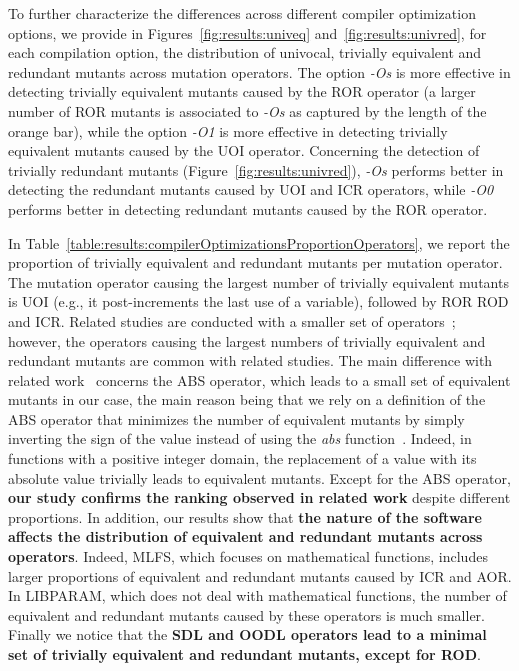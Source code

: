 To further characterize  the differences across different compiler optimization options, we provide in Figures~\ref{fig:results:univeq} and~\ref{fig:results:univred}, for each compilation option, the distribution of univocal, trivially equivalent and redundant mutants across mutation operators. The option \emph{-Os} is more effective in detecting trivially equivalent mutants caused by the ROR operator (a larger number of ROR mutants is associated to \emph{-Os} as captured by the length of the orange bar), while the option \emph{-O1} is more effective in detecting trivially equivalent mutants caused by the UOI operator. Concerning the detection of trivially redundant mutants (Figure~\ref{fig:results:univred}), \emph{-Os} performs better in detecting the redundant mutants caused by UOI and ICR operators, while \emph{-O0} performs better in detecting redundant mutants caused by the ROR operator.

In Table~\ref{table:results:compilerOptimizationsProportionOperators}, we report the proportion of trivially equivalent and  redundant mutants per mutation operator. The mutation operator causing the largest number of trivially equivalent mutants is UOI (e.g., it post-increments the last use of a variable), followed by ROR 
ROD 
and ICR. 
Related studies are conducted with a smaller set of operators~\cite{kintis2017detecting}; however, the operators causing the largest numbers of trivially equivalent and redundant mutants are common with related studies. The main difference with related work~\cite{kintis2017detecting} concerns the ABS operator, which leads to a small set of equivalent mutants in our case, the main reason being that we rely on a definition of the ABS operator that minimizes the number of equivalent mutants by simply inverting the sign of the value instead of using the \emph{abs} function~\cite{kintis2018effective}. Indeed, in functions with a positive integer domain, the replacement of a value with its absolute value trivially leads to equivalent mutants. Except for the ABS operator, \textbf{our study confirms the ranking observed in related work} despite different proportions. In addition, our results show that \textbf{the nature of the software affects the distribution of equivalent and redundant mutants across operators}. Indeed, MLFS, which focuses on mathematical functions, includes larger proportions of equivalent and redundant mutants caused by ICR and AOR. In LIBPARAM, which does not deal with mathematical functions, the number of equivalent and redundant mutants caused by these operators is much smaller. Finally we notice that the \textbf{SDL and OODL operators lead to a minimal set of trivially equivalent and redundant mutants, except for ROD}.

